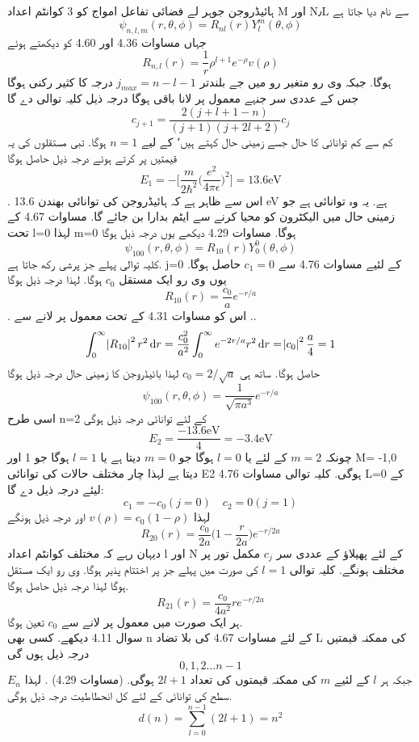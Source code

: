 \documentclass{book}
\begin{document}
ہائیڈروجن جوہر لے فضائی تفاعل  امواج کو 3 کوانٹم اعداد M اور N٫L سے نام دیا جاتا ہے 
 \[\psi_{n,l,m}(r,\theta,\phi)=R_{nl}(r)Y_{l}^{m}(\theta,\phi)\]
 جہاں مساوات 4.36 اور 4.60 کو دیکھتے ہوئے
 \[R_{n,l}(r)=\frac{1}{r}\rho^{l+1}e^{-\rho}v(\rho)\] 
 ہوگا. جبکہ وی رو متغير رو میں جے بلندتر
\(j_{max}=n-l-1\)
درجہ کا كثير رکنی ہوگا جس کے عددی سر جنہے معمول پر لانا باقی ہوگا  درجہ ذیل کلیہ توالی دے گا
 \[c_{j+1}=\frac{2(j+l+1-n)}{(j+1)(j+2l+2)}c_{j}\]
كم سے كم توانائی کا حال جسے زمینی حال کہتے ہیں٬ کے لیے
 \(n=1\) 
ہوگا. تبی مستقلوں کی یہ قیمتیں پر کرتے ہوئے درجہ ذیل حاصل ہوگا
 \[\boxed{E_{1}=-\big[\frac{m}{2\hbar^{2}}\big(\frac{e^{2}}{4\pi\epsilon}\big)^{2}\big]=13.6\text{eV}}\]
. اس سے ظاہر ہے کہ  ہائیڈروجن کی توانائی بھندن 13.6 eV ہے. یہ وہ توانائی ہے جو زمینی حال میں الیکٹرون کو محیا کرنے سے ایٹم بدارا بن جائے گا. مساوات 4.67 کے تحت l=0  لہذا m=0  ہوگا. مساوات 4.29 دیکھے یوں درجہ ذیل ہوگا
 \[\psi_{100}(r,\theta,\phi)=R_{10}(r)Y_{0}^{0}(\theta,\phi)\]
 کلیہ توالی پہلے جز پرشی رکھ جاتا ہے. j=0 کے لئیے مساوات 4.76 سے
 \(c_{1}=0\) 
 حاصل ہوگا. یوں وی رو ایک مستقل 
  \(c_{0}\)
  ہوگا. لہذا درجہ ذیل ہوگا
   \[R_{10}(r)=\frac{c_{0}}{a}e^{-r/a}\]
  . اس کو مساوات 4.31 کے تحت معمول پر لانے
سے
..\[\int_{0}^{\infty}\abs{R_{10}}^{2}r^{2}\dif{r}=\frac{c_{0}^{2}}{a^{2}}\int_{0}^{\infty}e^{-2r/a}r^{2}\dif{r}=\abs{c_{0}}^{2}\frac{a}{4}=1\]
حاصل ہوگا. ساتھ ہی
\(c_{0}=2/\sqrt{a}\)
لہذا بائیڈروجن کا زمینی حال درجہ ذیل ہوگا
\[\psi_{100}(r,\theta,\phi)=\frac{1}{\sqrt{\pi a^{3}}}e^{-r/a}\]
اسی طرح n=2  کے لئے توانائی درجہ ذیل ہوگی
\[E_{2}=\frac{-13.6\text{eV}}{4}=-3.4\text{eV}\]
چونکہ
 \(m=2\) 
کے لئے یا 
\(l=0\) 
ہوگا جو
\( m=0\) 
دیتا ہے يا
 \(l=1\) 
ہوگا جو 1 اور M= -1,0 دیتا ہے لہذا چار مختلف حالات کی توانائی E2 ہوگی. کلیہ توالی مساوات 4.76  L=0 کے لیئے درجہ ذیل دے گا:
\[c_{1}=-c_{0} (j=0) \quad c_{2}=0 (j=1)\]
لہذا
\(v(\rho)=c_{0}(1-\rho)\)
اور درجہ ذیل ہونگے
 \[R_{20}(r)=\frac{c_{0}}{2a}\big(1-\frac{r}{2a}\big)e^{-r/2a}\]
دیہان رہے کہ مختلف کوانٹم اعداد l اور N کے لئے پھیلاؤ کے عددی سر
 \(c_{j}\)
 مکمل تور پر مختلف ہونگے. کلیہ توالی
  \(l= 1\)
  کی صورت میں پہلے جز پر اختتام پذیر ہوگا. وی رو ایک مستقل ہوگا لہذا درجہ ذیل حاصل ہوگا.
   \[R_{21}(r)=\frac{c_{0}}{4a^{2}}re^{-r/2a}\]
ہر ایک صورت میں معمول پر لانے سے
 \(c_{0}\) 
تعین ہوگا.\\
سوال 4.11 دیکھے. کسی بھی n کے لئے مساوات 4.67 کی بلا تضاد L کی ممکنہ قیمتیں درجہ ذیل ہوں گی 
\[0,1,2\dotsc n-1\]
جبکہ ہر
 \(l \)
کے لئیے 
\(m\)
 کی ممکنہ قیمتوں کی تعداد
 \( 2l+1\) 
 ہوگی. (مساوات 4.29) . لہذا
  \(E_{n}\)
  سطح کی توانائی کے لئے کل انحطاطيت درجہ ذیل ہوگی.
\[d(n)=\sum_{l=0}^{n-1}(2l+1)=n^{2}\]
\end{document}
